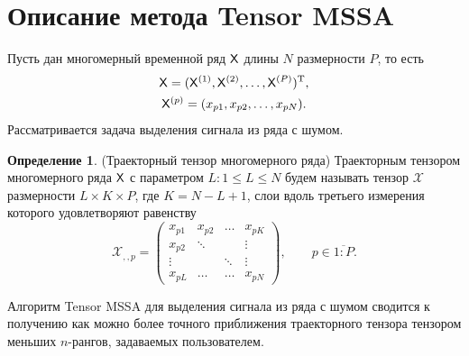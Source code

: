 \documentclass[11pt]{article}
\theoremstyle{plain}
\theoremstyle{definition}
\newtheorem{definition}{Определение}
\theoremstyle{remark}
\begin{document}
    \section{Описание метода Tensor MSSA}\label{sec:Tensor-MSSA-method-description}
    Пусть дан многомерный временной ряд $\mathsf{X}$ длины $N$ размерности $P$, то есть
    \begin{gather*}
        \mathsf{X} = (\mathsf{X}^{(1)}, \mathsf{X}^{(2)}, \ldots, \mathsf{X}^{(P)})^{\mathrm{T}},\\
        \mathsf{X}^{(p)} = (x_{p1}, x_{p2}, \ldots, x_{pN}).
    \end{gather*}
    Рассматривается задача выделения сигнала из ряда с шумом.

    \begin{definition}(Траекторный тензор многомерного ряда)
        Траекторным тензором многомерного ряда $\mathsf{X}$ с параметром $L: 1\leqslant L \leqslant N$
        будем называть тензор $\mathcal{X}$ размерности $L\times K \times P$, где $K = N - L + 1$,
        слои вдоль третьего измерения которого удовлетворяют равенству
        \[
            \mathcal{X}_{,,p}=
            \begin{pmatrix}
                x_{p1} & x_{p2} & \ldots & x_{pK} \\
                x_{p2} & \ddots &        & \vdots \\
                \vdots &        & \ddots & \vdots \\
                x_{pL} & \ldots & \ldots & x_{pN}
            \end{pmatrix},
            \qquad p\in \overline{1:P}.
        \]
    \end{definition}

    Алгоритм Tensor MSSA для выделения сигнала из ряда с шумом сводится к получению
    как можно более точного приближения траекторного тензора тензором меньших $n$-рангов, задаваемых пользователем.
\end{document}
